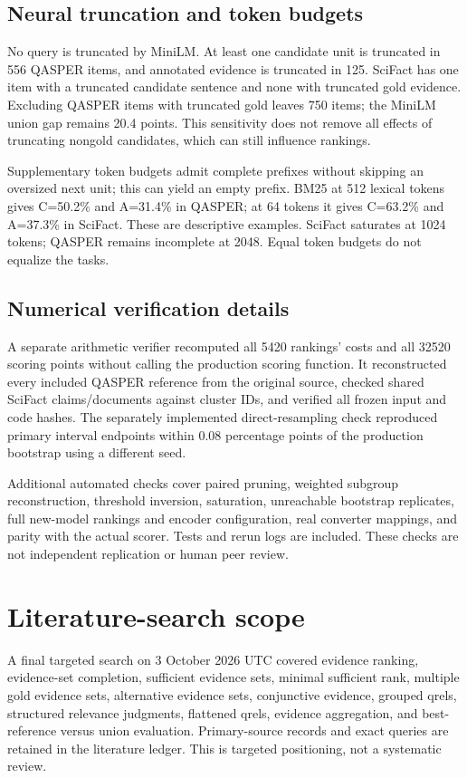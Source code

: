 \documentclass[twoside,a4paper,11pt]{article}
\begin{document}
\subsection{Neural truncation and token budgets}
No query is truncated by MiniLM. At least one candidate unit is truncated in 556 QASPER items, and annotated evidence is truncated in 125. SciFact has one item with a truncated candidate sentence and none with truncated gold evidence. Excluding QASPER items with truncated gold leaves 750 items; the MiniLM union gap remains 20.4 points. This sensitivity does not remove all effects of truncating nongold candidates, which can still influence rankings.

Supplementary token budgets admit complete prefixes without skipping an oversized next unit; this can yield an empty prefix. BM25 at 512 lexical tokens gives C=50.2\% and A=31.4\% in QASPER; at 64 tokens it gives C=63.2\% and A=37.3\% in SciFact. These are descriptive examples. SciFact saturates at 1024 tokens; QASPER remains incomplete at 2048. Equal token budgets do not equalize the tasks.


\subsection{Numerical verification details}
A separate arithmetic verifier recomputed all 5420 rankings' costs and all 32520 scoring points without calling the production scoring function. It reconstructed every included QASPER reference from the original source, checked shared SciFact claims/documents against cluster IDs, and verified all frozen input and code hashes. The separately implemented direct-resampling check reproduced primary interval endpoints within 0.08 percentage points of the production bootstrap using a different seed.

Additional automated checks cover paired pruning, weighted subgroup reconstruction, threshold inversion, saturation, unreachable bootstrap replicates, full new-model rankings and encoder configuration, real converter mappings, and parity with the actual scorer. Tests and rerun logs are included. These checks are not independent replication or human peer review.


\section{Literature-search scope}
A final targeted search on 3 October 2026 UTC covered evidence ranking, evidence-set completion, sufficient evidence sets, minimal sufficient rank, multiple gold evidence sets, alternative evidence sets, conjunctive evidence, grouped qrels, structured relevance judgments, flattened qrels, evidence aggregation, and best-reference versus union evaluation. Primary-source records and exact queries are retained in the literature ledger. This is targeted positioning, not a systematic review.
\end{document}
